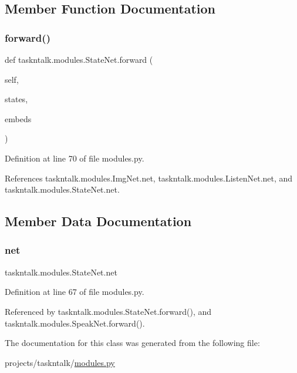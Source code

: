 \subsection{Member Function Documentation}
\mbox{\label{classtaskntalk_1_1modules_1_1StateNet_a174496bd7384bf033ccc667174f3be4c}} 
\subsubsection{\texorpdfstring{forward()}{forward()}}
{\footnotesize\ttfamily def taskntalk.\+modules.\+State\+Net.\+forward (\begin{DoxyParamCaption}\item[{}]{self,  }\item[{}]{states,  }\item[{}]{embeds }\end{DoxyParamCaption})}



Definition at line 70 of file modules.\+py.



References taskntalk.\+modules.\+Img\+Net.\+net, taskntalk.\+modules.\+Listen\+Net.\+net, and taskntalk.\+modules.\+State\+Net.\+net.



\subsection{Member Data Documentation}
\mbox{\label{classtaskntalk_1_1modules_1_1StateNet_a778b5aa25d2564cdd5dafc5e3e4a3999}} 
\subsubsection{\texorpdfstring{net}{net}}
{\footnotesize\ttfamily taskntalk.\+modules.\+State\+Net.\+net}



Definition at line 67 of file modules.\+py.



Referenced by taskntalk.\+modules.\+State\+Net.\+forward(), and taskntalk.\+modules.\+Speak\+Net.\+forward().



The documentation for this class was generated from the following file\+:\begin{DoxyCompactItemize}
\item 
projects/taskntalk/\hyperlink{projects_2taskntalk_2modules_8py}{modules.\+py}\end{DoxyCompactItemize}
